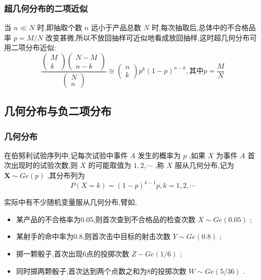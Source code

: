 \subsubsection{超几何分布的二项近似}

当 $ n \ll N $ 时,即抽取个数 $ n $ 远小于产品总数 $ N $ 时,每次抽取后,总体中的不合格品率 $ p=M/N $ 改变甚微,所以不放回抽样可近似地看成放回抽样,这时超几何分布可用二项分布近似:
\begin{equation}
\frac{\left( 
	\begin{array}{c}
	{M} \\ 
	{k}
	\end{array}
	\right) \left( 
	\begin{array}{c}
	{N-M} \\ 
	{n-k}
	\end{array}
	\right)}{\left( 
	\begin{array}{l}
	{N} \\ 
	{n}
	\end{array}
	\right)} \cong \left( 
\begin{array}{l}
{n} \\ 
{k}
\end{array}
\right) p^{k}(1-p)^{n-k}, \text{其中} p=\frac{M}{N}  \label{eq:2.4.7}
\end{equation}

\subsection{几何分布与负二项分布}\label{ssec:2.4.4}

\subsubsection{几何分布}

在伯努利试验序列中,记每次试验中事件 $ A $ 发生的概率为 $ p $ ,如果 $ X $ 为事件 $ A $ 首次出现时的试验次数,则 $ X $ 的可能取值为 $ 1,2, \cdots $ ,称 $ X $ 服从几何分布,记为 $ \boldsymbol{X} \sim G e(p) $ ,其分布列为
\begin{equation}
P(X=k)=(1-p)^{k-1} p, k=1,2, \cdots \label{eq:2.4.8}
\end{equation}

实际中有不少随机变量服从几何分布,臂如,

\begin{itemize}
	\item 某产品的不合格率为0.05,则首次查到不合格品的检查次数 $ X \sim Ge(0.05) $ ;
	\item 某射手的命中率为0.8,则首次击中目标的射击次数 $ Y\sim Ge(0.8) $ ;
	\item 掷一颗骰子,首次出现6点的投掷次数 $ Z-G e(1 / 6) $ ;
	\item 同时掷两颗骰子,首次达到两个点数之和为8的投掷次数 $ W \sim G e(5 / 36) $ .
\end{itemize}

